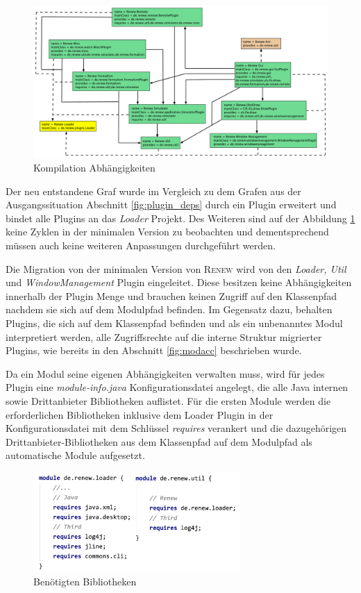 	\begin{figure}[h!]
	  \centering
	  \includegraphics[width=\textwidth]{material/images/renew_plugin_dependencies-module-info.pdf}
	  \caption{Kompilation Abhängigkeiten}
	  \label{fig:mod_deps}
	\end{figure}

	Der neu entstandene Graf wurde im Vergleich zu dem Grafen aus der Ausgangssituation Abschnitt \ref{fig:plugin_deps} durch ein Plugin erweitert und bindet alle Plugins an das \textit{Loader} Projekt. Des Weiteren sind auf der Abbildung \ref{fig:mod_deps} keine Zyklen in der minimalen Version zu beobachten und dementsprechend müssen auch keine weiteren Anpassungen durchgeführt werden. \bigbreak

	Die Migration von der minimalen Version von \textsc{Renew} wird von den \textit{Loader, Util} und \textit{WindowManagement} Plugin eingeleitet. Diese besitzen keine Abhängigkeiten innerhalb der Plugin Menge und brauchen keinen Zugriff auf den Klassenpfad nachdem sie sich auf dem Modulpfad befinden. Im Gegensatz dazu, behalten Plugins, die sich auf dem Klassenpfad befinden und als ein unbenanntes Modul interpretiert werden, alle Zugriffsrechte auf die interne Struktur migrierter Plugins, wie bereits in den Abschnitt \ref{fig:modacc} beschrieben wurde.\bigbreak

	Da ein Modul seine eigenen Abhängigkeiten verwalten muss, wird für jedes Plugin eine \textit{module-info.java} Konfigurationsdatei angelegt, die alle Java internen sowie Drittanbieter Bibliotheken auflistet. Für die ersten Module werden die erforderlichen Bibliotheken inklusive dem Loader Plugin in der Konfigurationsdatei mit dem Schlüssel \textit{requires} verankert und die dazugehörigen Drittanbieter-Bibliotheken aus dem Klassenpfad auf dem Modulpfad als automatische Module aufgesetzt.

	\begin{figure}[h!]
	  \centering
	  \includegraphics[width=0.7\textwidth]{material/images/loaderUtil-info.png}
	  \caption{Benötigten Bibliotheken}
	  \label{fig:loaderUtil}
	\end{figure}


